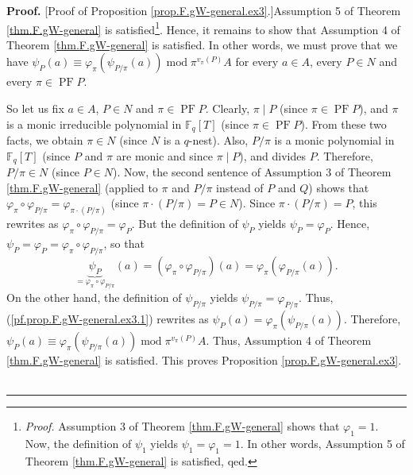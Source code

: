 \documentclass[numbers=enddot,12pt,final,onecolumn,notitlepage]{scrartcl}%
\theoremstyle{definition}
\newenvironment{proof}[1][Proof]{\noindent\textbf{#1.} }{\ \rule{0.5em}{0.5em}}
\begin{document}
\begin{proof}
[Proof of Proposition \ref{prop.F.gW-general.ex3}.]Assumption 5 of Theorem
\ref{thm.F.gW-general} is satisfied\footnote{\textit{Proof.} Assumption 3 of
Theorem \ref{thm.F.gW-general} shows that $\varphi_{1}=1$. Now, the definition
of $\psi_{1}$ yields $\psi_{1}=\varphi_{1}=1$. In other words, Assumption 5 of
Theorem \ref{thm.F.gW-general} is satisfied, qed.}. Hence, it remains to show
that Assumption 4 of Theorem \ref{thm.F.gW-general} is satisfied. In other
words, we must prove that we have $\psi_{P}\left(  a\right)  \equiv
\varphi_{\pi}\left(  \psi_{P/\pi}\left(  a\right)  \right)  \operatorname{mod}%
\pi^{v_{\pi}\left(  P\right)  }A$ for every $a\in A$, every $P\in N$ and every
$\pi\in\operatorname*{PF}P$.

So let us fix $a\in A$, $P\in N$ and $\pi\in\operatorname*{PF}P$. Clearly,
$\pi\mid P$ (since $\pi\in\operatorname*{PF}P$), and $\pi$ is a monic
irreducible polynomial in $\mathbb{F}_{q}\left[  T\right]  $ (since $\pi
\in\operatorname*{PF}P$). From these two facts, we obtain $\pi\in N$ (since
$N$ is a $q$-nest). Also, $P/\pi$ is a monic polynomial in $\mathbb{F}%
_{q}\left[  T\right]  $ (since $P$ and $\pi$ are monic and since $\pi\mid P$),
and divides $P$. Therefore, $P/\pi\in N$ (since $P\in N$). Now, the second
sentence of Assumption 3 of Theorem \ref{thm.F.gW-general} (applied to $\pi$
and $P/\pi$ instead of $P$ and $Q$) shows that $\varphi_{\pi}\circ
\varphi_{P/\pi}=\varphi_{\pi\cdot\left(  P/\pi\right)  }$ (since $\pi
\cdot\left(  P/\pi\right)  =P\in N$). Since $\pi\cdot\left(  P/\pi\right)
=P$, this rewrites as $\varphi_{\pi}\circ\varphi_{P/\pi}=\varphi_{P}$. But the
definition of $\psi_{P}$ yields $\psi_{P}=\varphi_{P}$. Hence, $\psi
_{P}=\varphi_{P}=\varphi_{\pi}\circ\varphi_{P/\pi}$, so that%
\begin{equation}
\underbrace{\psi_{P}}_{=\varphi_{\pi}\circ\varphi_{P/\pi}}\left(  a\right)
=\left(  \varphi_{\pi}\circ\varphi_{P/\pi}\right)  \left(  a\right)
=\varphi_{\pi}\left(  \varphi_{P/\pi}\left(  a\right)  \right)  .
\label{pf.prop.F.gW-general.ex3.1}%
\end{equation}
On the other hand, the definition of $\psi_{P/\pi}$ yields $\psi_{P/\pi
}=\varphi_{P/\pi}$. Thus, (\ref{pf.prop.F.gW-general.ex3.1}) rewrites as
$\psi_{P}\left(  a\right)  =\varphi_{\pi}\left(  \psi_{P/\pi}\left(  a\right)
\right)  $. Therefore, $\psi_{P}\left(  a\right)  \equiv\varphi_{\pi}\left(
\psi_{P/\pi}\left(  a\right)  \right)  \operatorname{mod}\pi^{v_{\pi}\left(
P\right)  }A$. Thus, Assumption 4 of Theorem \ref{thm.F.gW-general} is
satisfied. This proves Proposition \ref{prop.F.gW-general.ex3}.
\end{proof}
\end{document}
